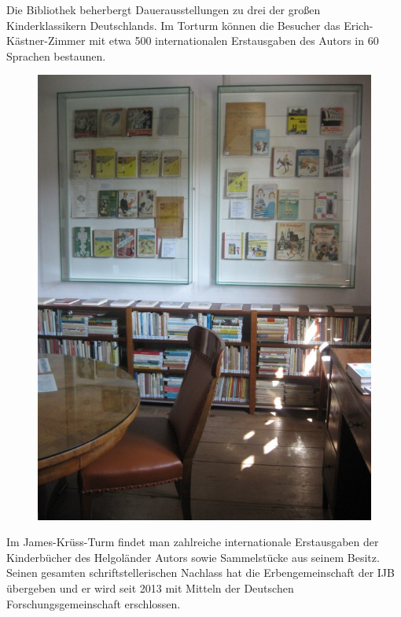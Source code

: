 \documentclass[a4paper,
fontsize=11pt,
oneside,
numbers=noperiodatend,
parskip=half-,
bibliography=totoc,
final
]{scrartcl}
\begin{document}
Die Bibliothek beherbergt Dauerausstellungen zu drei der großen
Kinderklassikern Deutschlands. Im Torturm können die Besucher das
Erich-Kästner-Zimmer mit etwa 500 internationalen Erstausgaben des
Autors in 60 Sprachen bestaunen.

\begin{figure}[htbp]
\centering
\includegraphics{img/bild22.jpg}
\end{figure}

Im James-Krüss-Turm findet man zahlreiche internationale Erstausgaben
der Kinderbücher des Helgoländer Autors sowie Sammelstücke aus seinem
Besitz. Seinen gesamten schriftstellerischen Nachlass hat die
Erbengemeinschaft der IJB übergeben und er wird seit 2013 mit Mitteln
der Deutschen Forschungsgemeinschaft erschlossen.
\end{document}
